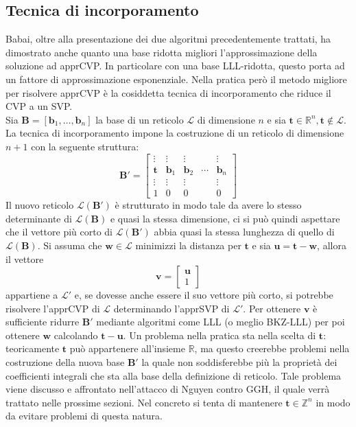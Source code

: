 \subsection{Tecnica di incorporamento}
Babai, oltre alla presentazione dei due algoritmi precedentemente trattati, ha dimostrato
anche quanto una base ridotta migliori l'approssimazione della soluzione ad apprCVP.
In particolare con una base LLL-ridotta, questo porta ad un fattore di approssimazione
esponenziale. Nella pratica però il metodo migliore per risolvere apprCVP è la cosiddetta tecnica di
incorporamento\cite{Galbraith18} che riduce il CVP a un SVP.  
\\
Sia $\mathbf{B} = [\mathbf{b}_1,\dots, \mathbf{b}_n]$ la base di un reticolo $\mathcal{L}$
di dimensione $n$ e sia $\mathbf{t} \in \mathbb{R}^n, \mathbf{t} \notin \mathcal{L}$. 
La tecnica di incorporamento impone la costruzione di un reticolo di dimensione $n+1$ con
la seguente struttura:
\[
    \mathbf{B}' =
    \begin{bmatrix}
        \vdots & \vdots & \vdots & & \vdots\\
        \mathbf{t} & \mathbf{b}_1 & \mathbf{b}_2 & \cdots & \mathbf{b}_n\\
        \vdots & \vdots & \vdots & & \vdots\\
        1 & 0 & 0 & & 0
    \end{bmatrix}
\]
Il nuovo reticolo $\mathcal{L}(\mathbf{B}')$ è strutturato in modo tale da avere lo stesso 
determinante di $\mathcal{L}(\mathbf{B})$ e quasi la stessa dimensione, ci si può quindi 
aspettare che il vettore più corto di $\mathcal{L}(\mathbf{B}')$ abbia quasi la stessa 
lunghezza di quello di $\mathcal{L}(\mathbf{B})$. Si assuma che $\mathbf{w} \in \mathcal{L}$
minimizzi la distanza per $\mathbf{t}$ e sia $\mathbf{u} = \mathbf{t}-\mathbf{w}$, allora il vettore
\[
    \mathbf{v} =
    \begin{bmatrix}
        \mathbf{u}\\
        1
    \end{bmatrix}
\]
appartiene a $\mathcal{L}'$ e, se dovesse anche essere il suo vettore più corto, si 
potrebbe risolvere l'apprCVP di $\mathcal{L}$ determinando l'apprSVP di $\mathcal{L}'$.
Per ottenere $\mathbf{v}$ è sufficiente ridurre $\mathbf{B}'$
mediante algoritmi come LLL (o meglio BKZ-LLL) per poi ottenere $\mathbf{w}$ calcolando 
$\mathbf{t}-\mathbf{u}$.
Un problema nella pratica sta nella scelta di $\mathbf{t}$: teoricamente
$\mathbf{t}$ può appartenere all'insieme $\mathbb{R}$, ma questo creerebbe problemi nella
costruzione della nuova base $\mathbf{B}'$ la quale non soddisferebbe più la proprietà dei 
coefficienti integrali che sta alla base della definizione di reticolo. Tale problema viene
discusso e affrontato nell'attacco di Nguyen contro GGH, il quale verrà trattato nelle prossime sezioni.
Nel concreto si tenta di mantenere $\mathbf{t} \in \mathbb{Z}^n$ in modo da evitare problemi
di questa natura.
\clearpage

